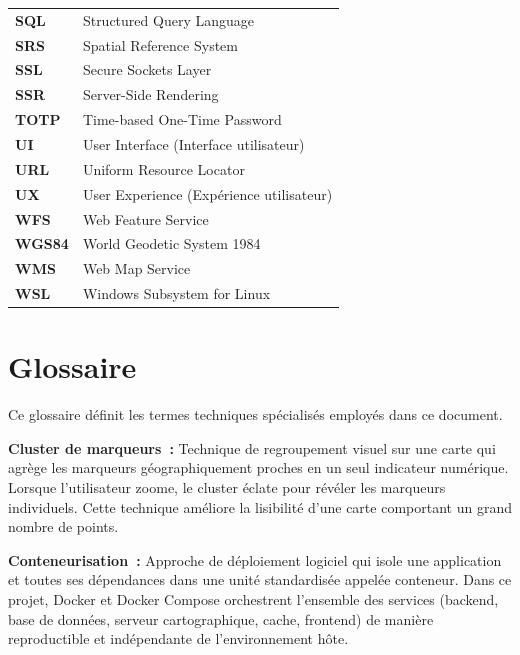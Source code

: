 \documentclass[12pt, a4paper]{report}
\begin{document}
\begin{tabular}{%
  >{\bfseries}p{3.2cm}%
  p{10.8cm}}
  SQL     & Structured Query Language \\
  \rowcolor{eeclightgreen!60}
  SRS     & Spatial Reference System \\
  SSL     & Secure Sockets Layer \\
  \rowcolor{eeclightgreen!60}
  SSR     & Server-Side Rendering \\
  TOTP    & Time-based One-Time Password \\
  \rowcolor{eeclightgreen!60}
  UI      & User Interface (Interface utilisateur) \\
  URL     & Uniform Resource Locator \\
  \rowcolor{eeclightgreen!60}
  UX      & User Experience (Expérience utilisateur) \\
  WFS     & Web Feature Service \\
  \rowcolor{eeclightgreen!60}
  WGS84   & World Geodetic System 1984 \\
  WMS     & Web Map Service \\
  \rowcolor{eeclightgreen!60}
  WSL     & Windows Subsystem for Linux \\
\end{tabular}
\endgroup

\clearpage

\chapter*{Glossaire}

\noindent
Ce glossaire définit les termes techniques spécialisés employés dans ce document.

\vspace{6pt}

\noindent\textbf{Cluster de marqueurs~:}
Technique de regroupement visuel sur une carte qui agrège les marqueurs
géographiquement proches en un seul indicateur numérique. Lorsque l'utilisateur
zoome, le cluster éclate pour révéler les marqueurs individuels. Cette technique
améliore la lisibilité d'une carte comportant un grand nombre de points.

\medskip
\noindent\textbf{Conteneurisation~:}
Approche de déploiement logiciel qui isole une application et toutes ses
dépendances dans une unité standardisée appelée conteneur. Dans ce projet, Docker
et Docker Compose orchestrent l'ensemble des services (backend, base de données,
serveur cartographique, cache, frontend) de manière reproductible et indépendante
de l'environnement hôte.
\end{document}
